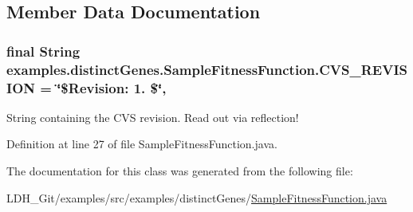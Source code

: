 \subsection{Member Data Documentation}
\hypertarget{classexamples_1_1distinct_genes_1_1_sample_fitness_function_ad2d3ad84bb4bc16043e9f1c105e4b889}{
\subsubsection[{C\-V\-S\-\_\-\-R\-E\-V\-I\-S\-I\-O\-N}]{\setlength{\rightskip}{0pt plus 5cm}final String examples.\-distinct\-Genes.\-Sample\-Fitness\-Function.\-C\-V\-S\-\_\-\-R\-E\-V\-I\-S\-I\-O\-N = \char`\"{}\$Revision\-: 1. \$\char`\"{}\hspace{0.3cm}{\ttfamily [static]}, {\ttfamily [private]}}}\label{classexamples_1_1distinct_genes_1_1_sample_fitness_function_ad2d3ad84bb4bc16043e9f1c105e4b889}
String containing the C\-V\-S revision. Read out via reflection! 

Definition at line 27 of file Sample\-Fitness\-Function.\-java.



The documentation for this class was generated from the following file\-:\begin{DoxyCompactItemize}
\item 
L\-D\-H\-\_\-\-Git/examples/src/examples/distinct\-Genes/\hyperlink{distinct_genes_2_sample_fitness_function_8java}{Sample\-Fitness\-Function.\-java}\end{DoxyCompactItemize}
